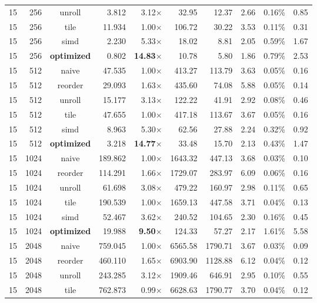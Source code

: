 \documentclass[11pt,a4paper]{article}
\begin{document}
{\begin{longtable}{rrcrrrrrrr}
15 & 256 & unroll & 3.812 & 3.12$\times$ & 32.95 & 12.37 & 2.66 & 0.16\% & 0.85 \\
15 & 256 & tile & 11.934 & 1.00$\times$ & 106.72 & 30.22 & 3.53 & 0.11\% & 0.31 \\
15 & 256 & simd & 2.230 & 5.33$\times$ & 18.02 & 8.81 & 2.05 & 0.59\% & 1.67 \\
15 & 256 & \textbf{optimized} & 0.802 & \textbf{14.83$\times$} & 10.78 & 5.80 & 1.86 & 0.79\% & 2.53 \\
\midrule
15 & 512 & naive & 47.535 & 1.00$\times$ & 413.27 & 113.79 & 3.63 & 0.05\% & 0.16 \\
15 & 512 & reorder & 29.093 & 1.63$\times$ & 435.60 & 74.08 & 5.88 & 0.05\% & 0.14 \\
15 & 512 & unroll & 15.177 & 3.13$\times$ & 122.22 & 41.91 & 2.92 & 0.08\% & 0.46 \\
15 & 512 & tile & 47.655 & 1.00$\times$ & 417.18 & 113.67 & 3.67 & 0.05\% & 0.16 \\
15 & 512 & simd & 8.963 & 5.30$\times$ & 62.56 & 27.88 & 2.24 & 0.32\% & 0.92 \\
15 & 512 & \textbf{optimized} & 3.218 & \textbf{14.77$\times$} & 33.48 & 15.70 & 2.13 & 0.43\% & 1.47 \\
\midrule
15 & 1024 & naive & 189.862 & 1.00$\times$ & 1643.32 & 447.13 & 3.68 & 0.03\% & 0.10 \\
15 & 1024 & reorder & 114.291 & 1.66$\times$ & 1729.07 & 283.97 & 6.09 & 0.06\% & 0.16 \\
15 & 1024 & unroll & 61.698 & 3.08$\times$ & 479.22 & 160.97 & 2.98 & 0.11\% & 0.65 \\
15 & 1024 & tile & 190.539 & 1.00$\times$ & 1659.13 & 447.58 & 3.71 & 0.04\% & 0.13 \\
15 & 1024 & simd & 52.467 & 3.62$\times$ & 240.52 & 104.65 & 2.30 & 0.16\% & 0.45 \\
15 & 1024 & \textbf{optimized} & 19.988 & \textbf{9.50$\times$} & 124.33 & 57.27 & 2.17 & 1.61\% & 5.58 \\
\midrule
15 & 2048 & naive & 759.045 & 1.00$\times$ & 6565.58 & 1790.71 & 3.67 & 0.03\% & 0.09 \\
15 & 2048 & reorder & 460.110 & 1.65$\times$ & 6903.90 & 1128.88 & 6.12 & 0.04\% & 0.12 \\
15 & 2048 & unroll & 243.285 & 3.12$\times$ & 1909.46 & 646.91 & 2.95 & 0.10\% & 0.55 \\
15 & 2048 & tile & 762.873 & 0.99$\times$ & 6628.63 & 1790.77 & 3.70 & 0.04\% & 0.12 \\

\end{longtable}}
\end{document}
